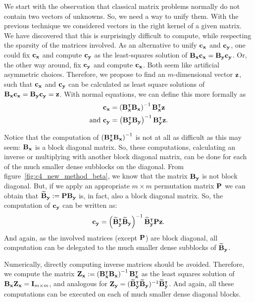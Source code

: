 We start with the observation that classical matrix problems normally do not contain two vectors of unknowns. So, we need a way to unify them. With the previous technique we considered vectors in the right kernel of a given matrix. We have discovered that this is surprisingly difficult to compute, while respecting the sparsity of the matrices involved. As an alternative to unify $\vb{c_x}$ and $\vb{c_y}$, one could fix $\vb{c_x}$ and compute $\vb{c_y}$ as the least-squares solution of $\vb{B_x}\vb{c_x} = \vb{B_y}\vb{c_y}$. Or, the other way around, fix $\vb{c_y}$ and compute $\vb{c_x}$. Both seem like artificial asymmetric choices. Therefore, we propose to find an $m$-dimensional vector $\vb{z}$, such that $\vb{c_x}$ and $\vb{c_y}$ can be calculated as least square solutions of $\vb{B_x}\vb{c_x} = \vb{B_y}\vb{c_y} = \vb{z}$. With normal equations, we can define this more formally as
\begin{align*}
    \vb{c_x}            & = \left(\vb{B_x^\intercal} \vb{B_x}\right)^{-1} \vb{B_x^\intercal} \vb{z}          \\
    \text{and }\vb{c_y} & = \left(\vb{B_y^\intercal} \vb{B_y}\right)^{-1} \vb{B_y^\intercal} \vb{z} \text{.}
\end{align*}

Notice that the computation of $\left(\vb{B_x^\intercal} \vb{B_x}\right)^{-1}$ is not at all as difficult as this may seem: $\vb{B_x}$ is a block diagonal matrix. So, these computations, calculating an inverse or multiplying with another block diagonal matrix, can be done for each of the much smaller dense subblocks on the diagonal. From figure~\ref{fig:c4_new_method_beta}, we know that the matrix $\vb{B_y}$ is not block diagonal. But, if we apply an appropriate $m \times m$ permutation matrix $\vb{P}$ we can obtain that $\vb{\widetilde{B}_y} := \vb{P} \vb{B_y}$ is, in fact, also a block diagonal matrix. So, the computation of $\vb{c_y}$ can be written as:
$$
    \vb{c_y} = \left(\vb{\widetilde{B}_y^\intercal} \vb{\widetilde{B}_y}\right)^{-1} \vb{\widetilde{B}^\intercal_y} \vb{P} \vb{z} \text{.}
$$
And again, as the involved matrices (except $\vb{P}$) are block diagonal, all computation can be delegated to the much smaller dense subblocks of $\vb{\widetilde{B}_y}$.

Numerically, directly computing inverse matrices should be avoided. Therefore, we compute the matrix $\vb{Z_x} := \left(\vb{B_x^\intercal} \vb{B_x}\right)^{-1} \vb{B_x^\intercal}$ as the least squares solution of $\vb{B_x} \vb{Z_x} = \vb{I}_{m \times m}$, and analogous for $\vb{Z_y} = (\vb{\widetilde{B}_y^\intercal} \vb{\widetilde{B}_y})^{-1} \vb{\widetilde{B}^\intercal_y}$. And again, all these computations can be executed on each of much smaller dense diagonal blocks.

